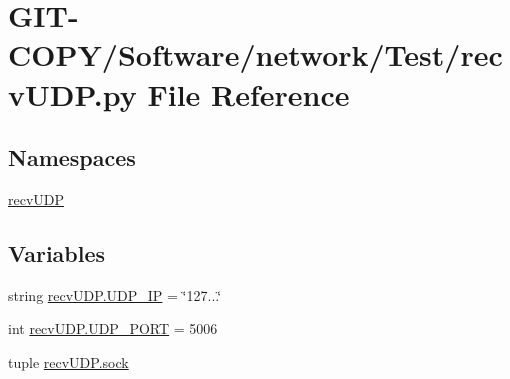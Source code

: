 \hypertarget{GIT-COPY_2Software_2network_2Test_2recvUDP_8py}{}\section{G\+I\+T-\/\+C\+O\+P\+Y/\+Software/network/\+Test/recv\+U\+D\+P.py File Reference}
\label{GIT-COPY_2Software_2network_2Test_2recvUDP_8py}
\subsection*{Namespaces}
\begin{DoxyCompactItemize}
\item 
 \hyperlink{namespacerecvUDP}{recv\+U\+D\+P}
\end{DoxyCompactItemize}
\subsection*{Variables}
\begin{DoxyCompactItemize}
\item 
string \hyperlink{namespacerecvUDP_a8caab7f3ca6ec1e8af1bb857f11aeb48}{recv\+U\+D\+P.\+U\+D\+P\+\_\+\+I\+P} = \char`\"{}127...\char`\"{}
\item 
int \hyperlink{namespacerecvUDP_ae81aefcf2264fa54e865146f5eb6c0f3}{recv\+U\+D\+P.\+U\+D\+P\+\_\+\+P\+O\+R\+T} = 5006
\item 
tuple \hyperlink{namespacerecvUDP_aebe004867e01e6cc169425bf7c5cf54e}{recv\+U\+D\+P.\+sock}
\end{DoxyCompactItemize}
